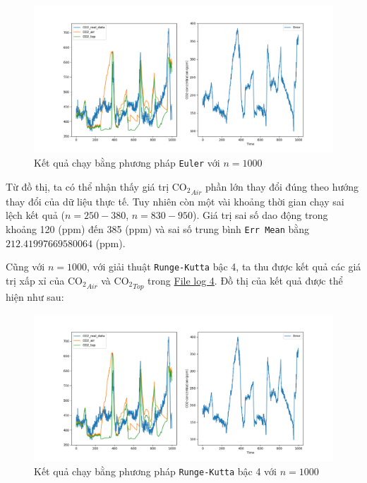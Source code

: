 \documentclass[a4paper]{article}
\begin{document}
\begin{figure}[!h]
    \centering
    \includegraphics[width=1.0\textwidth]{Euler2.png}
    \caption{Kết quả chạy bằng phương pháp \texttt{Euler} với $n=1000$}
    \label{fig:eul}
\end{figure}

Từ đồ thị, ta có thể nhận thấy giá trị $\mathrm{CO_{2}}_{Air}$ phần lớn thay đổi đúng theo hướng thay đổi của dữ liệu thực tế. Tuy nhiên còn một vài khoảng thời gian chạy sai lệch kết quả ($n = 250 - 380$, $n = 830 - 950$). Giá trị sai số dao động trong khoảng 120 (ppm) đến 385 (ppm) và sai số trung bình  \texttt{Err Mean} bằng $212.41997669580064$ (ppm).

\newpage

Cũng với $n=1000$, với giải thuật \texttt{Runge-Kutta} bậc 4, ta thu được kết quả các giá trị xấp xỉ của $\mathrm{CO_{2}}_{Air}$ và $\mathrm{CO_{2}}_{Top}$ trong \href{https://files.catbox.moe/o6q2o7.txt}{File log 4}. Đồ thị của kết quả được thể hiện như sau:

\begin{figure}[!h]
    \centering
    \includegraphics[width=1.0\textwidth]{rk4_2.png}
    \caption{Kết quả chạy bằng phương pháp \texttt{Runge-Kutta} bậc 4 với $n=1000$}
    \label{fig:rk4s}
\end{figure}
\end{document}
